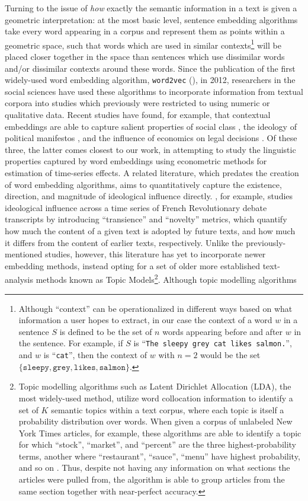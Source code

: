 Turning to the issue of \textit{how} exactly the semantic information in a text is given a geometric interpretation: at the most basic level, sentence embedding algorithms take every word appearing in a corpus and represent them as points within a geometric space, such that words which are used in similar contexts\footnote{Although ``context'' can be operationalized in different ways based on what information a user hopes to extract, in our case the context of a word $w$ in a sentence $S$ is defined to be the set of $n$ words appearing before and after $w$ in the sentence. For example, if $S$ is ``\texttt{The sleepy grey cat likes salmon.}'', and $w$ is ``\texttt{cat}'', then the context of $w$ with $n = 2$ would be the set $\{\texttt{sleepy}, \texttt{grey}, \texttt{likes}, \texttt{salmon}\}$.} will be placed closer together in the space than sentences which use dissimilar words and/or dissimilar contexts around these words. Since the publication of the first widely-used word embedding algorithm, \texttt{word2vec} (\cite{mikolov_distributed_2013}), in 2012, researchers in the social sciences have used these algorithms to incorporate information from textual corpora into studies which previously were restricted to using numeric or qualitative data. Recent studies have found, for example, that contextual embeddings are able to capture salient properties of social class \parencite{kozlowski_geometry_2019}, the ideology of political manifestos \parencite{rheault_word_2020}, and the influence of economics on legal decisions \parencite{ash_ideas_2017}. Of these three, the latter comes closest to our work, in attempting to study the linguistic properties captured by word embeddings using econometric methods for estimation of time-series effects. A related literature, which predates the creation of word embedding algorithms, aims to quantitatively capture the existence, direction, and magnitude of ideological influence directly. \cite{barron_individuals_2018}, for example, studies ideological influence across a time series of French Revolutionary debate transcripts by introducing ``transience'' and ``novelty'' metrics, which quantify how much the content of a given text is adopted by future texts, and how much it differs from the content of earlier texts, respectively. Unlike the previously-mentioned studies, however, this literature has yet to incorporate newer embedding methods, instead opting for a set of older more established text-analysis methods known as Topic Models\footnote{Topic modelling algorithms such as Latent Dirichlet Allocation (LDA), the most widely-used method, utilize word collocation information to identify a set of $K$ semantic topics within a text corpus, where each topic is itself a probability distribution over words. When given a corpus of unlabeled New York Times articles, for example, these algorithms are able to identify a topic for which ``stock'', ``market'', and ``percent'' are the three highest-probability terms, another where ``restaurant'', ``sauce'', ``menu'' have highest probability, and so on \parencite{blei_topic_2013}. Thus, despite not having any information on what sections the articles were pulled from, the algorithm is able to group articles from the same section together with near-perfect accuracy.}. Although topic modelling algorithms 